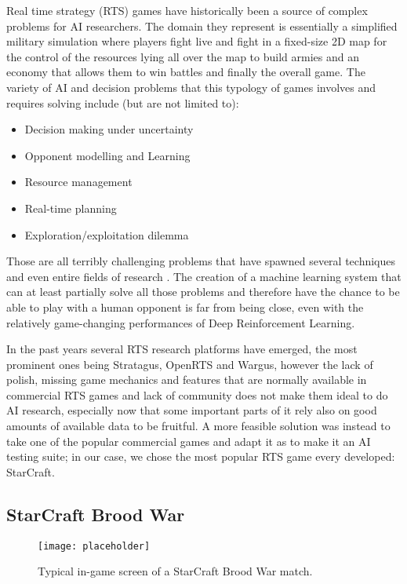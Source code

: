 Real time strategy (RTS) games have historically been a source of complex
problems for AI researchers. The domain they represent is essentially a
simplified military simulation where players fight live and fight in a
fixed-size 2D map for the control of the resources lying all over the map to
build armies and an economy that allows them to win battles and finally the
overall game. The variety of AI and decision problems that this typology of
games involves and requires solving include (but are not limited to):

\begin{itemize}
  \item Decision making under uncertainty
  \item Opponent modelling and Learning
  \item Resource management
  \item Real-time planning
  \item Exploration/exploitation dilemma
\end{itemize}

Those are all terribly challenging problems that have spawned several techniques
and even entire fields of research \citep{buro2003real}. The creation of a machine
learning system that can at least partially solve all those problems and
therefore have the chance to be able to play with a human opponent is far from
being close, even with the relatively game-changing performances of Deep
Reinforcement Learning.

In the past years several RTS research platforms have emerged, the most
prominent ones being Stratagus, OpenRTS and Wargus, however the lack of polish,
missing game mechanics and features that are normally available in commercial
RTS games and lack of community does not make them ideal to do AI research,
especially now that some important parts of it rely also on good amounts of
available data to be fruitful. A more feasible solution was instead to take one
of the popular commercial games and adapt it as to make it an AI testing suite;
in our case, we chose the most popular RTS game every developed: StarCraft.

\subsection{StarCraft Brood War}

\begin{figure}[h]
    \centering
    \texttt{[image: placeholder]}
    \caption{Typical in-game screen of a StarCraft Brood War match.}
    \label{fig:ALE}
\end{figure}


